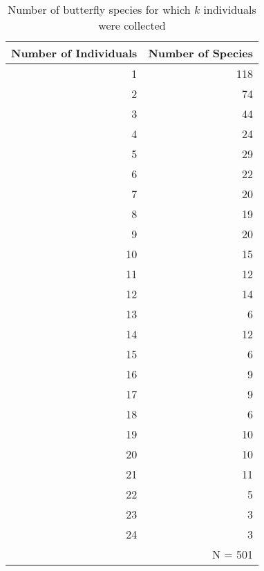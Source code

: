 \begin{table}[htb]
{
\small
\caption{Number of butterfly species for which $k$ individuals were collected}
\label{tab:butfly}
 \begin{center}
  \begin{tabular}{rr}
  \hline
Number of Individuals & Number of Species \\
  \hline
1 & 118 \\
2 & 74 \\
3 & 44 \\
4 & 24 \\
5 & 29 \\
6 & 22 \\
7 & 20 \\
8 & 19 \\
9 & 20 \\
10 & 15 \\
11 & 12 \\
12 & 14 \\
13 & 6 \\
14 & 12 \\
15 & 6 \\
16 & 9 \\
17 & 9 \\
18 & 6 \\
19 & 10 \\
20 & 10 \\
21 & 11 \\
22 & 5 \\
23 & 3 \\
24 & 3 \\
   & N = 501 \\ 
  \hline
  \end{tabular}
 \end{center}
}
\end{table}
